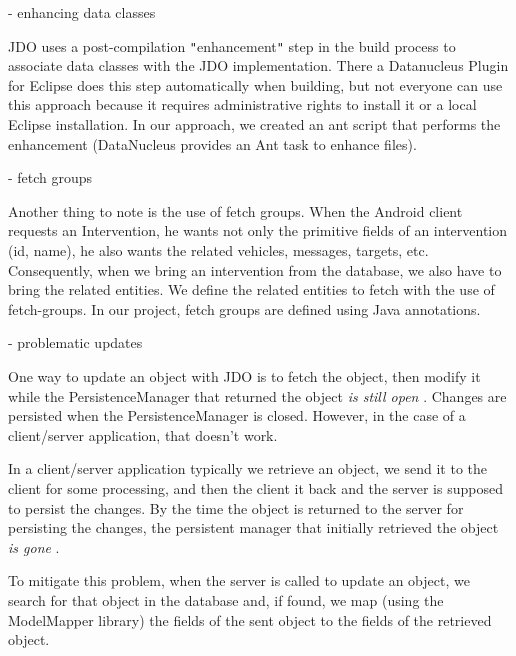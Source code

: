 \documentclass{article}
\begin{document}
\vspace{13pt}
{ - enhancing data classes}

\vspace{13pt}
{ JDO uses a post-compilation \texttt{"}enhancement\texttt{"} step 
in the build process to associate data classes with the JDO implementation. There 
a Datanucleus Plugin for Eclipse does this step automatically when building, but 
not everyone can use this approach because it requires administrative rights to 
install it or a local Eclipse installation. In our approach, we created an ant 
script that performs the enhancement (DataNucleus provides an Ant task to enhance 
files).}

\vspace{13pt}
{ - fetch groups}

\vspace{13pt}
{ Another thing to note is the use of fetch groups. When the Android 
client requests an Intervention, he wants not only the primitive fields of an intervention 
(id, name), he also wants the related vehicles, messages, targets, etc. Consequently, 
when we bring an intervention from the database, we also have to bring the related 
entities. We define the related entities to fetch with the use of fetch-groups. 
In our project, fetch groups are defined using Java annotations.}

\vspace{13pt}
{ - problematic updates}

\vspace{13pt}
{ One way to update an object with JDO is to fetch the object, then 
modify it while the PersistenceManager that returned the object }{ \textit{is 
still open}}{ . Changes are persisted when the PersistenceManager 
is closed. However, in the case of a client/server application, that doesn't work. 
}

\vspace{13pt}
{ In a client/server application typically we retrieve an object, 
we send it to the client for some processing, and then the client it back and the 
server is supposed to persist the changes. By the time the object is returned to 
the server for persisting the changes, the persistent manager that initially retrieved 
the object }{ \textit{is gone}}{ .}

\vspace{13pt}
{ To mitigate this problem, when the server is called to update 
an object, we search for that object in the database and, if found, we map (using 
the ModelMapper library) the fields of the sent object to the fields of the retrieved 
object.}
\end{document}
